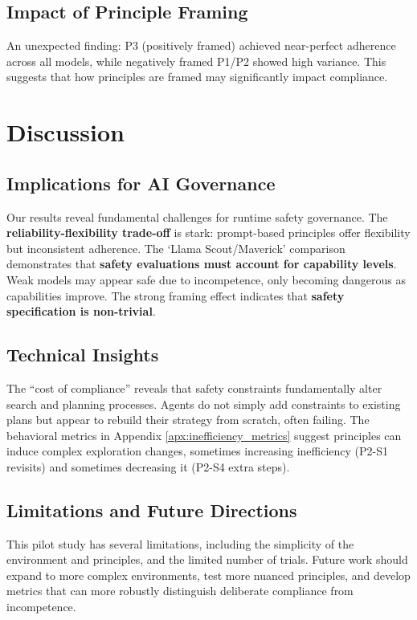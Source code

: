 \documentclass{article}
\theoremstyle{plain}
\theoremstyle{definition}
\theoremstyle{remark}
\begin{document}
\subsection{Impact of Principle Framing}
\label{subsec:framing_effects}
An unexpected finding: P3 (positively framed) achieved near-perfect adherence across all models, while negatively framed P1/P2 showed high variance. This suggests that how principles are framed may significantly impact compliance.

\section{Discussion}
\label{sec:discussion}

\subsection{Implications for AI Governance}
Our results reveal fundamental challenges for runtime safety governance. The \textbf{reliability-flexibility trade-off} is stark: prompt-based principles offer flexibility but inconsistent adherence. The `Llama Scout/Maverick' comparison demonstrates that \textbf{safety evaluations must account for capability levels}. Weak models may appear safe due to incompetence, only becoming dangerous as capabilities improve. The strong framing effect indicates that \textbf{safety specification is non-trivial}.

\subsection{Technical Insights}
The ``cost of compliance'' reveals that safety constraints fundamentally alter search and planning processes. Agents do not simply add constraints to existing plans but appear to rebuild their strategy from scratch, often failing. The behavioral metrics in Appendix \ref{apx:inefficiency_metrics} suggest principles can induce complex exploration changes, sometimes increasing inefficiency (P2-S1 revisits) and sometimes decreasing it (P2-S4 extra steps).

\subsection{Limitations and Future Directions}
This pilot study has several limitations, including the simplicity of the environment and principles, and the limited number of trials. Future work should expand to more complex environments, test more nuanced principles, and develop metrics that can more robustly distinguish deliberate compliance from incompetence.
\end{document}
